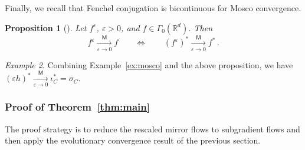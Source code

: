 \documentclass[11pt,english,reqno]{article}
\newcommand{\R}{\mathbb{R}}
\theoremstyle{plain}
\newtheorem{proposition}{Proposition}[section]
\theoremstyle{definition}
\theoremstyle{remark}
\newtheorem{example}[proposition]{Example}
\numberwithin{equation}{section}
\begin{document}
Finally, we recall that Fenchel conjugation is bicontinuous for Mosco convergence.

\begin{proposition}[{\cite[Thm.~3.18]{attouch1984variational}}]
	\label{prop:mosco-fenchel}
	Let $f^{\varepsilon}$, $\varepsilon > 0$, and $f\in\Gamma_0(\R^d)$. Then 
	\begin{equation*}
	f^{\varepsilon} \xrightarrow[\varepsilon \to 0]{\mathsf{M}} f \qquad \Longleftrightarrow \qquad (f^{\varepsilon})^* \xrightarrow[\varepsilon \to 0]{\mathsf{M}} f^* \, .
	\end{equation*} 
\end{proposition}

\begin{example}
	\label{ex:mosco-conjugate}
	Combining Example~\ref{ex:mosco} and the above proposition, we have $(\varepsilon h)^* \xrightarrow[\varepsilon \to 0]{\mathsf{M}} \iota_C^* = \sigma_C$.
\end{example}

\subsubsection{Proof of Theorem~\ref{thm:main}}
\label{subsec:proof-main}

The proof strategy is to reduce the rescaled mirror flows to subgradient flows and then apply the evolutionary convergence result of the previous section.
\end{document}
